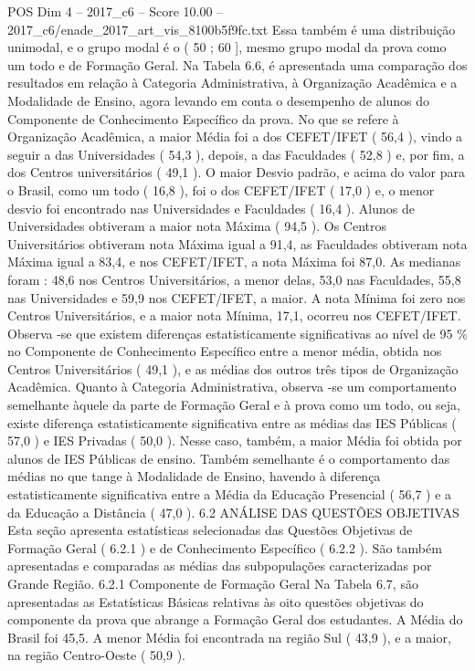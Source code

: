 \begin{textsample}{POS Dim 4 – 2017\_c6 – Score 10.00 – 2017\_c6/enade\_2017\_art\_vis\_8100b5f9fc.txt}
Essa também é uma distribuição unimodal, e o grupo modal é o ( 50 ; 60 ], mesmo grupo modal da prova como um todo e de Formação Geral.
Na Tabela 6.6, é apresentada uma comparação dos resultados em relação à Categoria Administrativa, à Organização Acadêmica e a Modalidade de Ensino, agora levando em conta o desempenho de alunos do Componente de Conhecimento Específico da prova.
No que se refere à Organização Acadêmica, a maior Média foi a dos CEFET/IFET ( 56,4 ), vindo a seguir a das Universidades ( 54,3 ), depois, a das Faculdades ( 52,8 ) e, por fim, a dos Centros universitários ( 49,1 ).
O maior Desvio padrão, e acima do valor para o Brasil, como um todo ( 16,8 ), foi o dos CEFET/IFET ( 17,0 ) e, o menor desvio foi encontrado nas Universidades e Faculdades ( 16,4 ).
Alunos de Universidades obtiveram a maior nota Máxima ( 94,5 ).
Os Centros Universitários obtiveram nota Máxima igual a 91,4, as Faculdades obtiveram nota Máxima igual a 83,4, e nos CEFET/IFET, a nota Máxima foi 87,0.
As medianas foram : 48,6 nos Centros Universitários, a menor delas, 53,0 nas Faculdades, 55,8 nas Universidades e 59,9 nos CEFET/IFET, a maior.
A nota Mínima foi zero nos Centros Universitários, e a maior nota Mínima, 17,1, ocorreu nos CEFET/IFET.
Observa -se que existem diferenças estatisticamente significativas ao nível de 95 \% no Componente de Conhecimento Específico entre a menor média, obtida nos Centros Universitários ( 49,1 ), e as médias dos outros três tipos de Organização Acadêmica.
Quanto à Categoria Administrativa, observa -se um comportamento semelhante àquele da parte de Formação Geral e à prova como um todo, ou seja, existe diferença estatisticamente significativa entre as médias das IES Públicas ( 57,0 ) e IES Privadas ( 50,0 ).
Nesse caso, também, a maior Média foi obtida por alunos de IES Públicas de ensino.
Também semelhante é o comportamento das médias no que tange à Modalidade de Ensino, havendo à diferença estatisticamente significativa entre a Média da Educação Presencial ( 56,7 ) e a da Educação a Distância ( 47,0 ). 6.2 ANÁLISE DAS QUESTÕES OBJETIVAS Esta seção apresenta estatísticas selecionadas das Questões Objetivas de Formação Geral ( 6.2.1 ) e de Conhecimento Específico ( 6.2.2 ).
São também apresentadas e comparadas as médias das subpopulações caracterizadas por Grande Região. 6.2.1 Componente de Formação Geral Na Tabela 6.7, são apresentadas as Estatísticas Básicas relativas às oito questões objetivas do componente da prova que abrange a Formação Geral dos estudantes.
A Média do Brasil foi 45,5.
A menor Média foi encontrada na região Sul ( 43,9 ), e a maior, na região Centro-Oeste ( 50,9 ).

\end{textsample}
